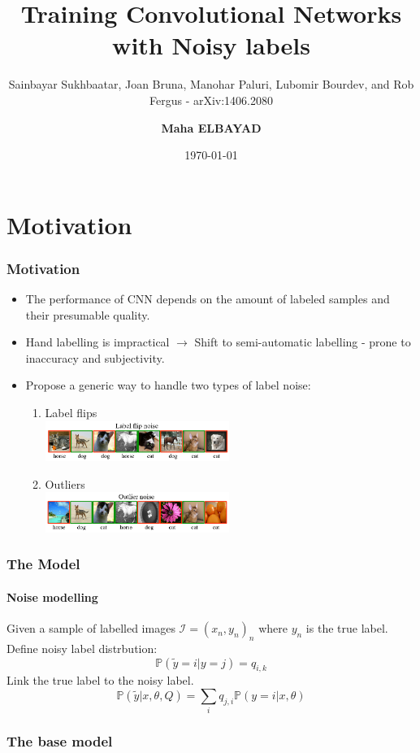 \documentclass{beamer}
\title{\sc \bf Training Convolutional Networks \\with Noisy labels}
\subtitle{\tiny Sainbayar Sukhbaatar, Joan Bruna, Manohar Paluri, Lubomir Bourdev, and Rob Fergus - arXiv:1406.2080}
\author{\bf Maha ELBAYAD}
\institute{M2 MVA 2015/2016}
\date{\today}
\newcommand{\p}{\mathbb{P}}
\begin{document}
\begin{frame}
    \titlepage
\end{frame}
\section{Motivation}    
\begin{frame}[label=Motivation]
    \frametitle{Motivation}
    \begin{itemize}
    \item The performance of CNN depends on the amount of labeled samples and their presumable quality.
    \item Hand labelling is impractical $\rightarrow$ Shift to semi-automatic labelling - prone to inaccuracy and subjectivity.
    \pause
    \item Propose a generic way to handle two types of label noise:
    \begin{enumerate}
    \item Label flips\\
    \includegraphics[width=6cm]{flip}
    \item Outliers\\
    \includegraphics[width=6cm]{outlier}
    \end{enumerate}
    \end{itemize}
    
\end{frame}
    
\begin{frame}
    
    \frametitle{The Model}
    \framesubtitle{Noise modelling}
    Given a sample of labelled images $\mathcal I={(x_n,y_n)}_n$ where $y_n$ is the true label.\\
    Define noisy label distrbution:
    \[\p(\tilde y=i|y=j)=q_{i,k}\tag{A confusion matrix}\]
    Link the true label to the noisy label.
    \[\p(\tilde y|x,\theta,Q)=\sum_iq_{j,i}\p(y=i|x,\theta)\]
\end{frame}

\begin{frame}    
    \frametitle{The base model}
    


    
\end{frame}
    
\end{document}
